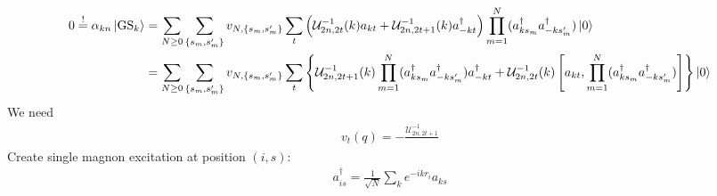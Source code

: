 \documentclass{article}
\begin{document}
\begin{align*}
	0 \overset ! = \alpha_{kn} \ket{\mathrm{GS}_k} &= \sum_{N\ge 0} \sum_{\{s_m,s'_m\}} v_{N,\{s_m,s'_m\}} \sum_t \left(\mathcal U^{-1}_{2n,2t}(k) a_{kt} + \mathcal U^{-1}_{2n,2t+1}(k) a_{-kt}^\dagger \right) \prod_{m=1}^N (a_{ks_m}^\dagger a_{-ks'_m}^\dagger) \ket 0 \\
%
	&= \sum_{N\ge 0} \sum_{\{s_m,s'_m\}} v_{N,\{s_m,s'_m\}} \sum_t \left\{ \mathcal U^{-1}_{2n,2t+1}(k) \prod_{m=1}^N (a_{ks_m}^\dagger a_{-ks'_m}^\dagger) a_{-kt}^\dagger + \mathcal U^{-1}_{2n,2t}(k) \left[a_{kt}, \prod_{m=1}^N (a_{ks_m}^\dagger a_{-ks'_m}^\dagger)\right] \right\} \ket 0
\end{align*}
We need
\begin{align}
	v_t(q) = -\frac{\mathcal U_{2n,2t+1}^{-1}}{}
\end{align}
Create single magnon excitation at position $(i, s)$:
\begin{align}
	a_{is}^\dagger = \frac{1}{\sqrt N} \sum_{k} e^{-ikr_i} a_{ks}
\end{align}
\end{document}
